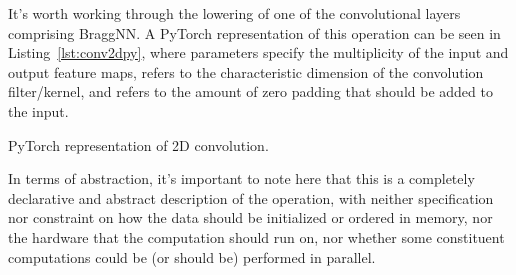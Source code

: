 It's worth working through the lowering of one of the convolutional layers comprising BraggNN.
A PyTorch representation of this operation can be seen in Listing~\ref{lst:conv2dpy}, where  parameters specify the multiplicity of the input and output feature maps,  refers to the characteristic dimension of the convolution filter/kernel, and  refers to the amount of zero padding that should be added to the input.
\begin{mylisting}{PyTorch representation of 2D convolution.}
	
	\label{lst:conv2dpy}
\end{mylisting}
In terms of abstraction, it's important to note here that this is a completely declarative and abstract description of the operation, with neither specification nor constraint on how the data should be initialized or ordered in memory, nor the hardware that the computation should run on, nor whether some constituent computations could be (or should be) performed in parallel.

